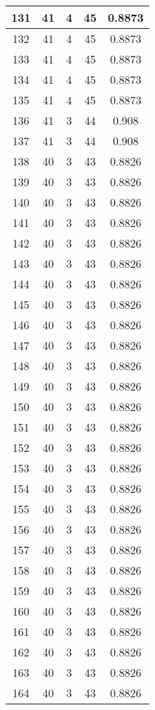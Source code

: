 \documentclass[letterpaper, 12pt]{article}
\begin{document}
\begin{longtable}{|c|c|c|c|c|}
\hline
131 & 41 & 4 & 45 & 0.8873 \\
\hline
132 & 41 & 4 & 45 & 0.8873 \\
\hline
133 & 41 & 4 & 45 & 0.8873 \\
\hline
134 & 41 & 4 & 45 & 0.8873 \\
\hline
135 & 41 & 4 & 45 & 0.8873 \\
\hline
136 & 41 & 3 & 44 & 0.908 \\
\hline
137 & 41 & 3 & 44 & 0.908 \\
\hline
138 & 40 & 3 & 43 & 0.8826 \\
\hline
139 & 40 & 3 & 43 & 0.8826 \\
\hline
140 & 40 & 3 & 43 & 0.8826 \\
\hline
141 & 40 & 3 & 43 & 0.8826 \\
\hline
142 & 40 & 3 & 43 & 0.8826 \\
\hline
143 & 40 & 3 & 43 & 0.8826 \\
\hline
144 & 40 & 3 & 43 & 0.8826 \\
\hline
145 & 40 & 3 & 43 & 0.8826 \\
\hline
146 & 40 & 3 & 43 & 0.8826 \\
\hline
147 & 40 & 3 & 43 & 0.8826 \\
\hline
148 & 40 & 3 & 43 & 0.8826 \\
\hline
149 & 40 & 3 & 43 & 0.8826 \\
\hline
150 & 40 & 3 & 43 & 0.8826 \\
\hline
151 & 40 & 3 & 43 & 0.8826 \\
\hline
152 & 40 & 3 & 43 & 0.8826 \\
\hline
153 & 40 & 3 & 43 & 0.8826 \\
\hline
154 & 40 & 3 & 43 & 0.8826 \\
\hline
155 & 40 & 3 & 43 & 0.8826 \\
\hline
156 & 40 & 3 & 43 & 0.8826 \\
\hline
157 & 40 & 3 & 43 & 0.8826 \\
\hline
158 & 40 & 3 & 43 & 0.8826 \\
\hline
159 & 40 & 3 & 43 & 0.8826 \\
\hline
160 & 40 & 3 & 43 & 0.8826 \\
\hline
161 & 40 & 3 & 43 & 0.8826 \\
\hline
162 & 40 & 3 & 43 & 0.8826 \\
\hline
163 & 40 & 3 & 43 & 0.8826 \\
\hline
164 & 40 & 3 & 43 & 0.8826 \\

\end{longtable}
\end{document}
